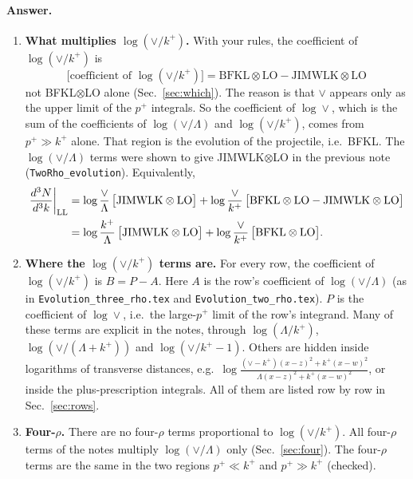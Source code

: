 \documentclass[10pt]{article}
\numberwithin{equation}{section}
\newcommand{\kp}{k^+}
\newcommand{\pp}{p^+}
\begin{document}
\paragraph{Answer.}
\begin{enumerate}
\item \textbf{What multiplies $\log(\vee/k^+)$.} With your rules, the coefficient of $\log(\vee/k^+)$ is
\begin{equation}
\boxed{\;\big[\text{coefficient of }\log(\vee/k^+)\big]=\text{BFKL}\otimes\text{LO}-\text{JIMWLK}\otimes\text{LO}\;}
\end{equation}
not BFKL$\otimes$LO alone (Sec.~\ref{sec:which}). The reason is that $\vee$ appears only as the upper limit of the $\pp$ integrals. So the coefficient of $\log\vee$, which is the sum of the coefficients of $\log(\vee/\Lambda)$ and $\log(\vee/k^+)$, comes from $\pp\gg\kp$ alone. That region is the evolution of the projectile, i.e.\ BFKL. The $\log(\vee/\Lambda)$ terms were shown to give JIMWLK$\otimes$LO in the previous note (\texttt{TwoRho\_evolution}). Equivalently,
\begin{align}
\frac{d^3N}{d^3k}\bigg|_{\rm LL}&=\log\frac{\vee}{\Lambda}\,\big[\text{JIMWLK}\otimes\text{LO}\big]+\log\frac{\vee}{k^+}\,\big[\text{BFKL}\otimes\text{LO}-\text{JIMWLK}\otimes\text{LO}\big]\notag\\
&=\log\frac{k^+}{\Lambda}\,\big[\text{JIMWLK}\otimes\text{LO}\big]+\log\frac{\vee}{k^+}\,\big[\text{BFKL}\otimes\text{LO}\big].
\end{align}
\item \textbf{Where the $\log(\vee/k^+)$ terms are.} For every row, the coefficient of $\log(\vee/k^+)$ is $B=P-A$. Here $A$ is the row's coefficient of $\log(\vee/\Lambda)$ (as in \texttt{Evolution\_three\_rho.tex} and \texttt{Evolution\_two\_rho.tex}). $P$ is the coefficient of $\log\vee$, i.e.\ the large-$\pp$ limit of the row's integrand. Many of these terms are explicit in the notes, through $\log(\Lambda/k^+)$, $\log(\vee/(\Lambda+k^+))$ and $\log(\vee/k^+-1)$. Others are hidden inside logarithms of transverse distances, e.g.\ $\log\frac{(\vee-k^+)(x-z)^2+k^+(x-w)^2}{\Lambda(x-z)^2+k^+(x-w)^2}$, or inside the plus-prescription integrals. All of them are listed row by row in Sec.~\ref{sec:rows}.
\item \textbf{Four-$\rho$.} There are no four-$\rho$ terms proportional to $\log(\vee/k^+)$. All four-$\rho$ terms of the notes multiply $\log(\vee/\Lambda)$ only (Sec.~\ref{sec:four}). The four-$\rho$ terms are the same in the two regions $\pp\ll\kp$ and $\pp\gg\kp$ (checked).

\end{enumerate}
\end{document}
